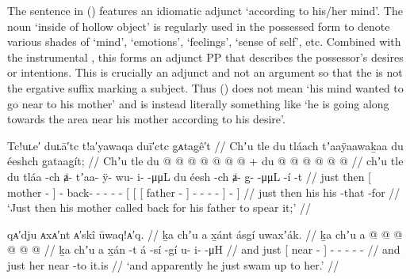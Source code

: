 The sentence in (\lastx) features an idiomatic adjunct  ‘according to his/her mind’.
The noun  ‘inside of hollow object’ is regularly used in the possessed form  to denote various shades of ‘mind’, ‘emotions’, ‘feelings’, ‘sense of self’, etc.
Combined with the instrumental , this forms an adjunct PP that describes the possessor’s desires or intentions.
This is crucially an adjunct and not an argument so that the  is not the ergative suffix marking a subject.
Thus (\lastx) does not mean ‘his mind wanted to go near to his mother’ and is instead literally something like ‘he is going along towards the area near his mother according to his desire’.

\ex\label{ex:100-122-mom-calls-dad-to-spear}%
%
\begingl
	\glpreamble	Tc!uʟe′ duʟā′tc t!a′yawaqa duī′ctc g̣ᴀtag̣ê′t //
	\glpreamble	Chʼu tle du tláach tʼaaÿaawaḵaa du éeshch g̱ataag̱ít; //
	\gla	Chʼu tle 
		{} du  @ {} {} 
		 @ {} @ {} @ {} @ {} @ {} @ {} +
		{} {} {} du  @ {} {}
			 @ {} @ {} @ {} @ {} @ {} {} {} {} //
	\glb	chʼu tle
		{} du tláa -ch {} ⱥ- tʼaa- ÿ- wu- i-  -μμL
		{} {} {} du éesh -ch {} 
			ⱥ- {} g̱-  -μμL -í {} -t {} //
	\glc	just then 
		{}[  mother - {}]
		- back- - - -  -
		{}[ {}[ {}[  father - {}]
			- \· -  - - {}] - {}] //
	\gld	just then
		{} his  {} {} 
		 {} {} {} {} {} {}
		{} {} {} his  {} {}
			 {} {} {} {} -that {} -for {} //
	\glft	‘Just then his mother called back for his father to spear it;’
		//
\endgl
\xe

\ex\label{ex:100-123-and-just-swims-up}%
%
\begingl
	\glpreamble	qᴀ′dju ᴀxᴀ′nt ᴀ′skî ūwaq!ᴀ′q. //
	\glpreamble	ḵa chʼu a x̱ánt ásgí uwaxʼák. //
	\gla	ḵa chʼu 
		{} a  @ {} {}  @ {} @ {}
		 @ {} @ {} @ {} //
	\glb	ḵa chʼu 
		{} a x̱án -t {} á -sí -gí 
		u- i-  -μH //
	\glc	and just 
		{}[  near - {}]  - -
		- -  - //
	\gld	and just 
		{} her near -to {} it.is \· {} 
		 {} {} {} //
	\glft	‘and apparently he just swam up to her.’
		//
\endgl
\xe

